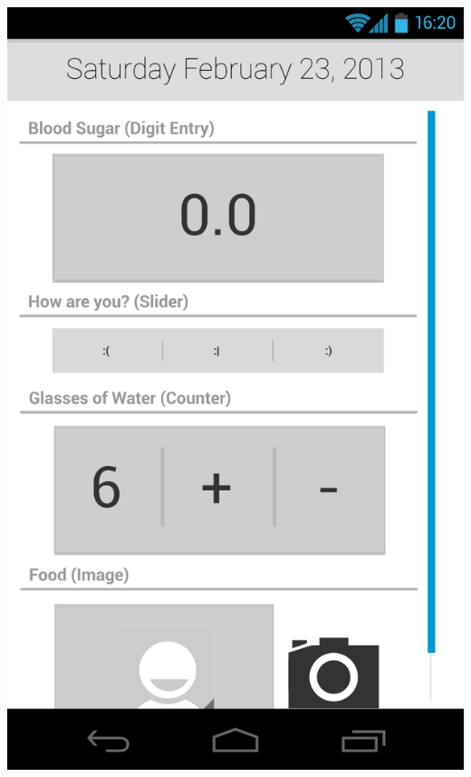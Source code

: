 \documentclass[pdftex,12pt,a4paper]{report}
\begin{document}
\begin{center}
	\includegraphics[scale=0.18]{Screens/03-Add--No-Selection.png}

\end{center}
\end{document}
